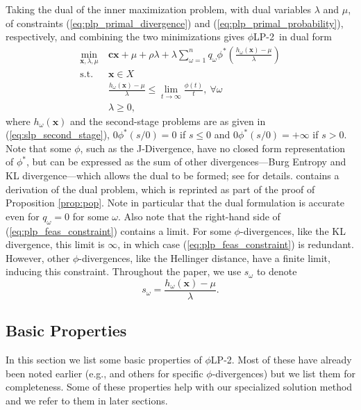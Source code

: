 \documentclass[12pt]{article}
\newcommand{\x}{\mathbf{x}}
\renewcommand{\c}{\mathbf{c}}
\theoremstyle{plain}
\theoremstyle{definition}
\theoremstyle{remark}
\newcommand{\st}{\mbox{s.t.}}
\newcommand{\plp}{$\phi$LP-2}
\begin{document}
Taking the dual of the inner maximization problem, with dual variables $\lambda$ and $\mu$, of constraints (\ref{eq:plp_primal_divergence}) and (\ref{eq:plp_primal_probability}), respectively, and combining the two minimizations gives \plp\ in dual form
\begin{align}
	\min_{\x,\lambda,\mu} \ & \c\x + \mu + \rho \lambda + \lambda \sum_{\omega=1}^{n} q_\omega \phi^*\left(\frac{h_\omega(\x) - \mu}{\lambda}\right) \label{eq:plp_two_stage} \\
	\st \ & \x \in X \nonumber \\
	& \frac{h_\omega(\x) - \mu}{\lambda} \leq \lim_{t \rightarrow \infty} \frac{\phi(t)}{t}, \ \forall \omega \label{eq:plp_feas_constraint}\\
	& \lambda \geq 0, \nonumber
\end{align}
where $h_\omega(\x)$ and the second-stage problems are as given in (\ref{eq:slp_second_stage}), $0\phi^*(s/0)=0$ if $s\leq 0$ and  $0\phi^*(s/0)=+\infty$ if $s > 0$.
Note that some $\phi$, such as the J-Divergence, have no closed form representation of $\phi^*$, but can be expressed as the sum of other divergences---Burg Entropy and KL divergence---which allows the dual to be formed; see \citep{bental2011robust} for details.
\citet[Theorem 1]{bental2011robust} contains a derivation of the dual problem, which is reprinted as part of the proof of Proposition \ref{prop:pop}.
Note in particular that the dual formulation is accurate even for $q_\omega = 0$ for some $\omega$.
Also note that the right-hand side of (\ref{eq:plp_feas_constraint}) contains a limit.
For some $\phi$-divergences, like the KL divergence, this limit is $\infty$, in which case (\ref{eq:plp_feas_constraint}) is redundant.
However, other $\phi$-divergences, like the Hellinger distance, have a finite limit, inducing this constraint.
Throughout the paper, we use $s_\omega$ to denote
\begin{equation}
	s_\omega = \frac{h_\omega(\x) - \mu}{\lambda}. \label{eq:s_omega_definition}
\end{equation}


\subsection{Basic Properties}
\label{ssec:basicprop}

In this section we list some basic properties of \plp.
Most of these have already been noted earlier (e.g., \citep{bental2011robust} and others for specific $\phi$-divergences) but we list them for completeness.
Some of these properties help with our specialized solution method and we refer to them in later sections.
\end{document}
